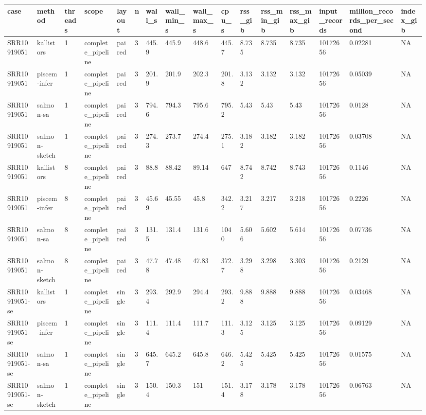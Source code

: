 \begin{tabular}{llllllllllllllll}
\toprule
case & method & threads & scope & layout & n & wall\_s & wall\_min\_s & wall\_max\_s & cpu\_s & rss\_gib & rss\_min\_gib & rss\_max\_gib & input\_records & million\_records\_per\_second & index\_gib \\
\midrule
SRR10919051 & kallistors & 1 & complete\_pipeline & paired & 3 & 445.9 & 445.9 & 448.6 & 445.7 & 8.735 & 8.735 & 8.735 & 10172656 & 0.02281 & NA \\
SRR10919051 & piscem-infer & 1 & complete\_pipeline & paired & 3 & 201.9 & 201.9 & 202.3 & 201.8 & 3.132 & 3.132 & 3.132 & 10172656 & 0.05039 & NA \\
SRR10919051 & salmon-sa & 1 & complete\_pipeline & paired & 3 & 794.6 & 794.3 & 795.6 & 795.2 & 5.43 & 5.43 & 5.43 & 10172656 & 0.0128 & NA \\
SRR10919051 & salmon-sketch & 1 & complete\_pipeline & paired & 3 & 274.3 & 273.7 & 274.4 & 275.1 & 3.182 & 3.182 & 3.182 & 10172656 & 0.03708 & NA \\
SRR10919051 & kallistors & 8 & complete\_pipeline & paired & 3 & 88.8 & 88.42 & 89.14 & 647 & 8.742 & 8.742 & 8.743 & 10172656 & 0.1146 & NA \\
SRR10919051 & piscem-infer & 8 & complete\_pipeline & paired & 3 & 45.69 & 45.55 & 45.8 & 342.2 & 3.217 & 3.217 & 3.218 & 10172656 & 0.2226 & NA \\
SRR10919051 & salmon-sa & 8 & complete\_pipeline & paired & 3 & 131.5 & 131.4 & 131.6 & 1040 & 5.606 & 5.602 & 5.614 & 10172656 & 0.07736 & NA \\
SRR10919051 & salmon-sketch & 8 & complete\_pipeline & paired & 3 & 47.78 & 47.48 & 47.83 & 372.7 & 3.298 & 3.298 & 3.303 & 10172656 & 0.2129 & NA \\
SRR10919051-se & kallistors & 1 & complete\_pipeline & single & 3 & 293.4 & 292.9 & 294.4 & 293.2 & 9.888 & 9.888 & 9.888 & 10172656 & 0.03468 & NA \\
SRR10919051-se & piscem-infer & 1 & complete\_pipeline & single & 3 & 111.4 & 111.4 & 111.7 & 111.3 & 3.125 & 3.125 & 3.125 & 10172656 & 0.09129 & NA \\
SRR10919051-se & salmon-sa & 1 & complete\_pipeline & single & 3 & 645.7 & 645.2 & 645.8 & 646.2 & 5.425 & 5.425 & 5.425 & 10172656 & 0.01575 & NA \\
SRR10919051-se & salmon-sketch & 1 & complete\_pipeline & single & 3 & 150.4 & 150.3 & 151 & 151.4 & 3.178 & 3.178 & 3.178 & 10172656 & 0.06763 & NA \\

\end{tabular}
